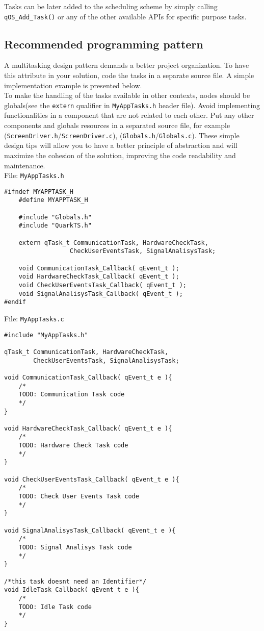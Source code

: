 Tasks can be later added to the scheduling scheme by simply calling \lstinline{qOS_Add_Task()} or any of the other available APIs for specific purpose tasks.

\subsection{Recommended programming pattern}
A multitasking design pattern demands a better project organization. To have this attribute in your solution, code the tasks in a separate source file. A simple implementation example is presented below. \\

To make the handling of the tasks available in other contexts, nodes should be globals(see the \lstinline{extern} qualifier in \lstinline{MyAppTasks.h} header file).  Avoid implementing functionalities in a component that are not related to each other. Put any other components and globals resources in a separated source file, for example (\lstinline{ScreenDriver.h}/\lstinline{ScreenDriver.c}),  (\lstinline{Globals.h}/\lstinline{Globals.c}). These simple design tips will allow you to have a better principle of abstraction and will maximize the cohesion of the solution, improving the code readability and maintenance. \\

File: \lstinline{MyAppTasks.h}
\begin{lstlisting}[style=CStyle]
#ifndef MYAPPTASK_H
    #define MYAPPTASK_H
    
    #include "Globals.h"
    #include "QuarkTS.h"
    
    extern qTask_t CommunicationTask, HardwareCheckTask, 
                  CheckUserEventsTask, SignalAnalisysTask;
    
    void CommunicationTask_Callback( qEvent_t );
    void HardwareCheckTask_Callback( qEvent_t );
    void CheckUserEventsTask_Callback( qEvent_t );
    void SignalAnalisysTask_Callback( qEvent_t );
#endif
\end{lstlisting}

File: \lstinline{MyAppTasks.c}
\begin{lstlisting}[style=CStyle]
#include "MyAppTasks.h"

qTask_t CommunicationTask, HardwareCheckTask, 
        CheckUserEventsTask, SignalAnalisysTask;

void CommunicationTask_Callback( qEvent_t e ){
    /*
    TODO: Communication Task code
    */
}

void HardwareCheckTask_Callback( qEvent_t e ){
    /*
    TODO: Hardware Check Task code
    */
}

void CheckUserEventsTask_Callback( qEvent_t e ){
    /*
    TODO: Check User Events Task code
    */
}

void SignalAnalisysTask_Callback( qEvent_t e ){
    /*
    TODO: Signal Analisys Task code
    */
}

/*this task doesnt need an Identifier*/
void IdleTask_Callback( qEvent_t e ){ 
    /*
    TODO: Idle Task code
    */
}
\end{lstlisting}


